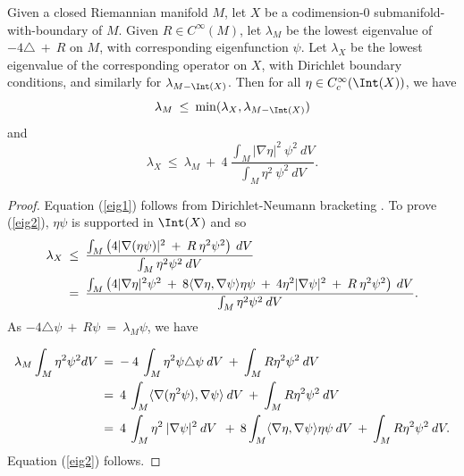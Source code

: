 \begin{lemma}
  \label{lem:kl-alternative-proof-cusp-incompressibility-estimates-spectral-geometry}
 \label{newprop1}
Given a closed Riemannian manifold $M$, let $X$ be a codimension-$0$
submanifold-with-boundary of $M$. Given $R \in C^\infty(M)$, let
$\lambda_M$ be the lowest eigenvalue of $-4\triangle \: + \: R$
on $M$, with corresponding eigenfunction $\psi$.
Let $\lambda_X$ be the lowest eigenvalue of the corresponding
operator on $X$, with Dirichlet boundary conditions, and similarly
for $\lambda_{M - \Int(X)}$. Then for all
$\eta \in C^\infty_c(\Int(X))$, we have
\begin{equation} \label{eig1}
\lambda_M \: \le \: \min(\lambda_X, \lambda_{M - \Int(X)})
\end{equation}
and
\begin{equation} \label{eig2}
\lambda_X \: \le \: \lambda_M \: + \: 4 \:
\frac{\int_M |\nabla \eta|^2 \: \psi^2 \: dV}{\int_M \eta^2 \:
\psi^2 \: dV}.
\end{equation}
\end{lemma}
\begin{proof}
Equation (\ref{eig1}) follows from Dirichlet-Neumann bracketing
\cite[Chapter XIII.15]{Reed-Simon}. To prove (\ref{eig2}),
$\eta \psi$ is supported in $\Int(X)$ and so
\begin{align}
\lambda_X \: & \le \: \frac{\int_M \left( 4 |\nabla(\eta \psi)|^2 \: + \:
R \: \eta^2 \psi^2 \right) \: dV}{\int_M \eta^2 \psi^2 \: dV} \\
& = \: \frac{\int_M \left( 4 |\nabla \eta|^2 \psi^2 \: + \:
8 \langle \nabla\eta, \nabla \psi \rangle \eta \psi \: + \:
4 \eta^2 |\nabla \psi|^2 \: + \:
R \: \eta^2 \psi^2 \right) \: dV}{\int_M \eta^2 \psi^2 \: dV}. \notag
\end{align}
As $- 4 \triangle \psi \: + \: R \psi \: = \: \lambda_M \psi$, we have

\begin{align}
\lambda_M \int_M \eta^2 \psi^2 dV \: & = \:
- \: 4 \: \int_M \eta^2 \psi \triangle \psi \: dV \: + \:
\int_M R \eta^2 \psi^2 \: dV \\
& = \:
4 \: \int_M \langle \nabla(\eta^2 \psi), \nabla \psi \rangle \: dV \:
+ \: \int_M R \eta^2 \psi^2 \: dV \notag \\
& = \: 4 \: \int_M \eta^2 \: |\nabla \psi|^2 \: dV \: \: + \:
8 \int_M \langle \nabla\eta, \nabla \psi \rangle \eta \psi \: dV
\: + \: \int_M R \eta^2 \psi^2 \: dV. \notag
\end{align}
Equation (\ref{eig2}) follows.
\end{proof}
